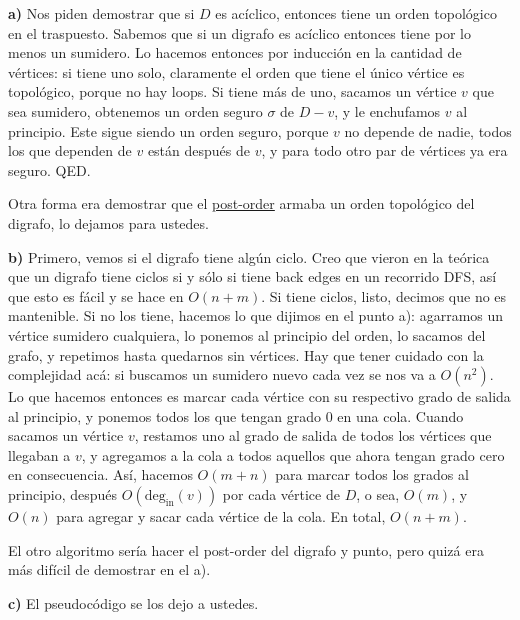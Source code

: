 \documentclass{article}
\begin{document}
\textbf{a)} Nos piden demostrar que si $D$ es acíclico, entonces tiene un orden topológico en el traspuesto. Sabemos que si un digrafo es acíclico entonces tiene por lo menos un sumidero. Lo hacemos entonces por inducción en la cantidad de vértices: si tiene uno solo, claramente el orden que tiene el único vértice es topológico, porque no hay loops. Si tiene más de uno, sacamos un vértice $v$ que sea sumidero, obtenemos un orden seguro $\sigma$ de $D - v$, y le enchufamos $v$ al principio. Este sigue siendo un orden seguro, porque $v$ no depende de nadie, todos los que dependen de $v$ están después de $v$, y para todo otro par de vértices ya era seguro. QED.

Otra forma era demostrar que el \href{https://en.wikipedia.org/wiki/Tree_traversal#Post-order,_LRN}{post-order} armaba un orden topológico del digrafo, lo dejamos para ustedes.

\textbf{b)} Primero, vemos si el digrafo tiene algún ciclo. Creo que vieron en la teórica que un digrafo tiene ciclos si y sólo si tiene back edges en un recorrido DFS, así que esto es fácil y se hace en $O(n+m)$. Si tiene ciclos, listo, decimos que no es mantenible. Si no los tiene, hacemos lo que dijimos en el punto a): agarramos un vértice sumidero cualquiera, lo ponemos al principio del orden, lo sacamos del grafo, y repetimos hasta quedarnos sin vértices. Hay que tener cuidado con la complejidad acá: si buscamos un sumidero nuevo cada vez se nos va a $O(n^2)$. Lo que hacemos entonces es marcar cada vértice con su respectivo grado de salida al principio, y ponemos todos los que tengan grado 0 en una cola. Cuando sacamos un vértice $v$, restamos uno al grado de salida de todos los vértices que llegaban a $v$, y agregamos a la cola a todos aquellos que ahora tengan grado cero en consecuencia. Así, hacemos $O(m+n)$ para marcar todos los grados al principio, después $O(\mathrm{deg_ {in}}(v))$ por cada vértice de $D$, o sea, $O(m)$, y $O(n)$ para agregar y sacar cada vértice de la cola. En total, $O(n + m)$. 

El otro algoritmo sería hacer el post-order del digrafo y punto, pero quizá era más difícil de demostrar en el a).

\textbf{c)} El pseudocódigo se los dejo a ustedes.
\end{document}
